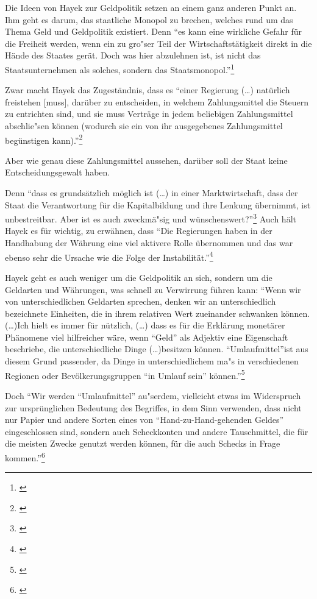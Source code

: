 \documentclass[
        onecolumn,
        a4paper,
        abstracton,
        parskip=half
        ,final
        ]{scrartcl}
\begin{document}
Die Ideen von Hayek zur Geldpolitik setzen an einem ganz anderen Punkt an. Ihm geht es darum, das staatliche Monopol zu brechen, welches rund um das Thema Geld und Geldpolitik existiert. Denn
"`es kann eine wirkliche Gefahr f{\"u}r die Freiheit werden, wenn ein zu gro{"s}er Teil der Wirtschaftst{\"a}tigkeit direkt in die H{\"a}nde des Staates ger{\"a}t. Doch was hier abzulehnen ist, ist nicht das Staatsunternehmen als solches, sondern das Staatsmonopol."'\footnote[411]{\citep*[S.290]{hayek1971}}

Zwar macht Hayek das Zugest{\"a}ndnis, dass es "`einer Regierung (\ldots) nat{\"u}rlich freistehen [muss], dar{\"u}ber zu entscheiden, in welchem Zahlungsmittel die Steuern zu entrichten sind, und sie muss Vertr{\"a}ge in jedem beliebigen Zahlungsmittel abschlie{"s}en k{\"o}nnen (wodurch sie ein von ihr ausgegebenes Zahlungsmittel beg{\"u}nstigen kann)."'\footnote[412]{\citep*[S.23]{Hayek1977}}

Aber wie genau diese Zahlungsmittel aussehen, dar{\"u}ber soll der Staat keine Entscheidungsgewalt haben.

Denn "`dass es grunds{\"a}tzlich m{\"o}glich ist (\ldots) in einer Marktwirtschaft, dass der Staat die Verantwortung f{\"u}r die Kapitalbildung und ihre Lenkung {\"u}bernimmt, ist unbestreitbar. Aber ist es auch zweckm{\"a}{"s}ig und w{\"u}nschenswert?"'\footnote[413]{\citep*[S.22]{Hayek1969}}
Auch h{\"a}lt Hayek es f{\"u}r wichtig, zu erw{\"a}hnen, dass "`Die Regierungen haben in der Handhabung der W{\"a}hrung eine viel aktivere Rolle {\"u}bernommen und das war ebenso sehr die Ursache wie die Folge der Instabilit{\"a}t."'\footnote[415]{ \citep*[S.409]{hayek1971}}

Hayek geht es auch weniger um die Geldpolitik an sich, sondern um die Geldarten und W{\"a}hrungen, was schnell zu Verwirrung f{\"u}hren kann: "`Wenn wir von unterschiedlichen Geldarten sprechen, denken wir an unterschiedlich bezeichnete Einheiten, die in ihrem relativen Wert zueinander schwanken k{\"o}nnen. (\ldots)Ich hielt es immer f{\"u}r n{\"u}tzlich, (\ldots) dass es f{\"u}r die Erkl{\"a}rung monet{\"a}rer Ph{\"a}nomene viel hilfreicher w{\"a}re, wenn "`Geld"' als Adjektiv eine Eigenschaft beschriebe, die unterschiedliche Dinge (\ldots)besitzen k{\"o}nnen. "`Umlaufmittel"'ist aus diesem Grund passender, da Dinge in unterschiedlichem ma{"s} in verschiedenen Regionen oder Bev{\"o}lkerungsgruppen "`in Umlauf sein"' k{\"o}nnen."'\footnote[416]{\citep*[S.40f]{Hayek1977}}

Doch "`Wir werden "`Umlaufmittel"' au{"s}erdem, vielleicht etwas im Widerspruch zur urspr{\"u}nglichen Bedeutung des Begriffes, in dem Sinn verwenden, dass nicht nur Papier und andere Sorten eines von "`Hand-zu-Hand-gehenden Geldes"' eingeschlossen sind, sondern auch Scheckkonten und andere Tauschmittel, die f{\"u}r die meisten Zwecke genutzt werden k{\"o}nnen, f{\"u}r die auch Schecks in Frage kommen."'\footnote[417]{\citep*[S.43]{Hayek1977}}
\end{document}
